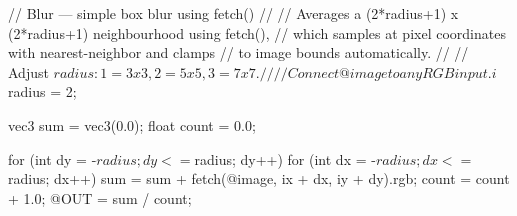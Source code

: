 // Blur — simple box blur using fetch()
//
// Averages a (2*radius+1) x (2*radius+1) neighbourhood using fetch(),
// which samples at pixel coordinates with nearest-neighbor and clamps
// to image bounds automatically.
//
// Adjust $radius: 1 = 3x3, 2 = 5x5, 3 = 7x7.
//
// Connect @image to any RGB input.

i$radius = 2;

vec3 sum = vec3(0.0);
float count = 0.0;

for (int dy = -$radius; dy <= $radius; dy++) {
    for (int dx = -$radius; dx <= $radius; dx++) {
        sum = sum + fetch(@image, ix + dx, iy + dy).rgb;
        count = count + 1.0;
    }
}
@OUT = sum / count;